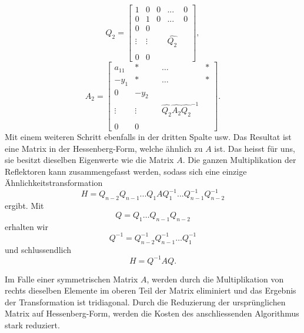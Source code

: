 \begin{equation}
	Q_{2}=
	\begin{bmatrix}
	1 & 0 & 0 & ... & 0\\
	0 & 1 & 0 & ... & 0\\
	0 & 0 &\\
	\vdots & \vdots & &\hat{Q_2} &\\
	 &  &\\
	0 & 0 &
	\end{bmatrix},
\end{equation}	
\begin{equation}
	A_{2}=
	\begin{bmatrix}
	a_{11} & * &  & \dots & *\\
	-y_{1} & * &  & \dots & *\\
	0 & -y_{2} &\\
	\vdots & \vdots  & &\hat{Q_2}\hat{A_{2}}\hat{Q_2}^{-1} &\\
	 &  &\\
	0 & 0 &
	\end{bmatrix}.
\end{equation}
Mit einem weiteren Schritt ebenfalls in der dritten Spalte usw.
Das Resultat ist eine Matrix in der Hessenberg-Form, welche ähnlich zu $A$ ist.
Das heisst für uns, sie besitzt dieselben Eigenwerte wie die Matrix $A$.
Die ganzen Multiplikation der Reflektoren kann zusammengefasst werden, sodass sich eine einzige Ähnlichkeitstransformation
\begin{equation}
	H=Q_{n-2}Q_{n-1}...Q_{1}AQ_{1}^{-1}...Q_{n-1}^{-1}Q_{n-2}^{-1}
\end{equation}
ergibt.
Mit 
\begin{equation}
	Q=Q_{1}\dots Q_{n-1}Q_{n-2}
\end{equation}
erhalten wir
\begin{equation}
	Q^{-1} = Q_{n-2}^{-1}Q_{n-1}^{-1}\dots Q_{1}^{-1}
\end{equation}
und schlussendlich
\begin{equation}
H=Q^{-1}AQ.
\end{equation}

Im Falle einer symmetrischen Matrix $A$, werden durch die Multiplikation von rechts dieselben Elemente im oberen Teil der Matrix eliminiert und das Ergebnis der Transformation ist tridiagonal.
Durch die Reduzierung der ursprünglichen Matrix auf Hessenberg-Form, werden die Kosten des anschliessenden Algorithmus stark reduziert.
